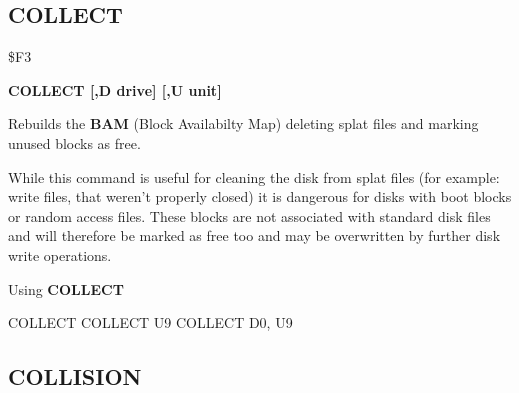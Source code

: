 \subsection{COLLECT}
\begin{description}[leftmargin=3cm,style=nextline]
\item [Token:] \$F3
\item [Format:] {\bf COLLECT [,D drive] [,U unit] }
\item [Usage:]
   Rebuilds the {\bf BAM}
   (Block Availabilty Map) deleting splat files and marking
   unused blocks as free.

   \drivedefinition

   \unitdefinition

\item [Remarks:]
   While this command is useful for cleaning the disk from
   splat files (for example: write files, that weren't properly closed)
   it is dangerous for disks with boot blocks or random access files.
   These blocks are not associated with standard disk files
   and will therefore be marked as free too and may be overwritten
   by further disk write operations.

\item [Example:] Using {\bf COLLECT}
\begin{screenoutput}
  COLLECT
  COLLECT U9
  COLLECT D0, U9
\end{screenoutput}
\end{description}


\newpage
\subsection{COLLISION}

